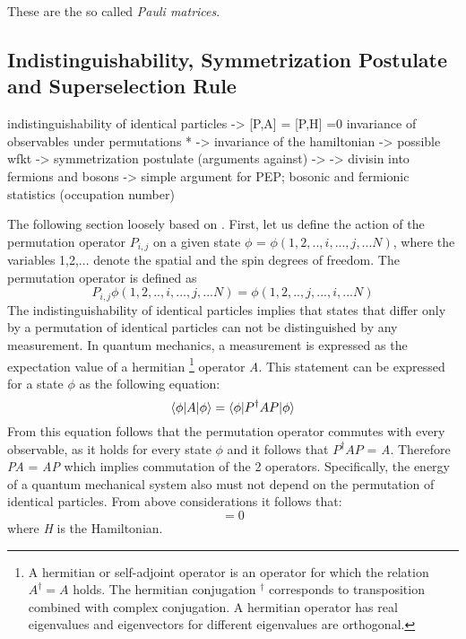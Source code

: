 These are the so called \textit{Pauli matrices}.

\subsection{Indistinguishability, Symmetrization Postulate and Superselection Rule}
\label{sec:IndSymPostSS}

indistinguishability of identical particles -> [P,A] = [P,H] =0 invariance of observables under permutations * -> invariance of the hamiltonian -> possible wfkt -> symmetrization postulate (arguments against) -> -> divisin into fermions and bosons -> simple argument for PEP; bosonic and fermionic statistics (occupation number)

The following section loosely based on \cite{Sperandio2008}. First, let us define the action of the permutation operator $P_{i,j}$ on a given state $\phi$ = $\phi(1,2,..,i,...,j,...N)$, where the variables 1,2,... denote the spatial and the spin degrees of freedom. The permutation operator is defined as
\begin{equation}
 P_{i,j}\phi(1,2,..,i,...,j,...N) = \phi(1,2,..,j,...,i,...N)
\end{equation} 
The indistinguishability of identical particles implies that states that differ only by a permutation of identical particles can not be distinguished by any measurement. In quantum mechanics, a measurement is expressed as the expectation value of a hermitian \footnote{A hermitian or self-adjoint operator is an operator for which the relation $A^{\dag} = A$ holds. The hermitian conjugation $^{\dag}$ corresponds to transposition combined with complex conjugation. A hermitian operator has real eigenvalues and eigenvectors for different eigenvalues are orthogonal.} operator \textit{A}. This statement can be expressed for a state $\phi$ as the following equation:
\begin{equation}
 \braket{\phi|A|\phi} = \braket{\phi|P^{\dag}AP|\phi}
\end{equation} 
From this equation follows that the permutation operator commutes with every observable, as it holds for every state $\phi$ and it follows that $P^{\dag}AP$ = \textit{A}. Therefore \textit{PA} = \textit{AP} which implies commutation of the 2 operators. Specifically, the energy of a quantum mechanical system also must not depend on the permutation of identical particles. From above considerations it follows that:
\begin{equation}
 [P,H] = 0
\end{equation} 
where \textit{H} is the Hamiltonian. 

